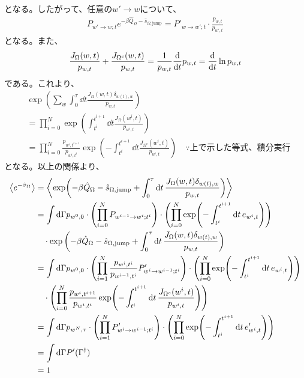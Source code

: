 \documentclass[a4paper,11pt]{jsarticle}
\numberwithin{equation}{section}
\begin{document}
となる。したがって、任意の$w' \to w$について、
\begin{align}
    P_{w' \to w; t} e^{-\beta \hat{Q}_{\Omega}-\hat{s}_{\Omega, \text{jump}}} = P'_{w \to w'; t} \cdot \frac{p_{w,t}}{p_{w',t}}
\end{align}
となる。また、
\begin{align}
    \frac{J_{\Omega}(w,t)}{p_{w,t}} + \frac{J_{\Omega^c}(w,t)}{p_{w,t}} = \frac{1}{p_{w,t}} \dv{t} p_{w,t} = \dv{t} \ln p_{w,t}
\end{align}
である。これより、
\begin{align}
    &\exp(\sum_{w }\int_{0}^{\tau} \dd{t} \frac{J_{\Omega}(w,t)\delta_{w(t), w}}{p_{w,t}}) \\
    &= \prod_{i=0}^{N} \exp(\int_{t^i}^{t^{i+1}} \dd{t} \frac{J_{\Omega}(w^{i},t)}{p_{w^{i},t}}) \\
    &= \prod_{i=0}^{N} \frac{p_{w^{i},t^{i+1}}}{p_{w^{i},t^{i}}} \exp(-\int_{t^i}^{t^{i+1}} \dd{t} \frac{J_{\Omega^c}(w^{i},t)}{p_{w^{i},t}}) \quad \because \text{上で示した等式、積分実行} 
\end{align}
となる。以上の関係より、
\begin{align}
    \ev{e^{-\hat{\sigma}_\Omega}} &= \ev{\exp(-\beta \hat{Q}_\Omega -  \hat{s}_{\Omega,\text{jump}} + \int_{0}^{\tau} \dd{t} \frac{J_{\Omega}(w,t)\delta_{w(t), w}}{p_{w,t}})} \\
    &= \int \dd \Gamma p_{w^{0},0} \cdot \left(\prod_{i=0}^{N} P_{w^{i-1} \to w^{i}; t^i} \right) \cdot \left(\prod_{i=0}^{N} \exp(-\int_{t^i}^{t^{i+1}} \dd{t} e_{w^{i},t}) \right) \\
    &\quad \cdot \exp\left(-\beta \hat{Q}_\Omega -  \hat{s}_{\Omega,\text{jump}} + \int_{0}^{\tau} \dd{t} \frac{J_{\Omega}(w,t)\delta_{w(t), w}}{p_{w,t}} \right) \\
    &= \int \dd \Gamma p_{w^{0},0} \cdot \left(\prod_{i=1}^{N} \frac{p_{w^{i},t^{i}}}{p_{w^{i-1},t^{i}}} P'_{w^{i} \to w^{i-1}; t^i} \right) \cdot \left(\prod_{i=0}^{N} \exp(-\int_{t^i}^{t^{i+1}} \dd{t} e_{w^{i},t}) \right) \\
    &\quad \cdot \left(\prod_{i=0}^{N} \frac{p_{w^{i},t^{i+1}}}{p_{w^{i},t^{i}}} \exp(-\int_{t^i}^{t^{i+1}} \dd{t} \frac{J_{\Omega^c}(w^{i},t)}{p_{w^{i},t}}) \right) \\
    &= \int \dd \Gamma p_{w^{N},\tau} \cdot \left(\prod_{i=1}^{N} P'_{w^{i} \to w^{i-1}; t^i} \right) \cdot \left(\prod_{i=0}^{N} \exp(-\int_{t^i}^{t^{i+1}} \dd{t} e'_{w^{i},t}) \right) \\
    &=\int \dd \Gamma P'(\Gamma^{\dagger})\\
    &= 1
\end{align}
\end{document}

